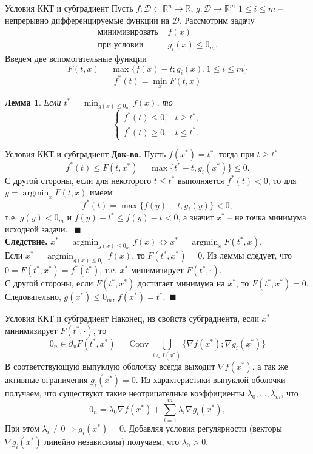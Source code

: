 \documentclass[10pt, handout]{beamer}
\DeclareMathOperator{\argmin}{argmin}
\DeclareMathOperator{\conv}{Conv}
\newtheorem{lemma_ru}{Лемма}[]
\begin{document}
\begin{frame}{Условия ККТ и субградиент}
Пусть $f:\mathcal{D}\subset \mathbb{R}^n\rightarrow \mathbb{R}$, $g:\mathcal{D}\rightarrow \mathbb{R}^m$ $1\leq i \leq m$ -- непрерывно дифференцируемые функции на $\mathcal{D}$. Рассмотрим задачу
$$
\begin{array}{ll}
\mbox{минимизировать } & f(x)\\
\mbox{при условии } & g_i(x)\leq 0_m.
\end{array}
$$
\pause
Введем две вспомогательные функции
$$
F(t, x)=\max\{f(x)-t; g_i(x), 1\leq i\leq m\}
$$
$$f^*(t)=\min_{x}F(t,x)$$
\pause
\begin{lemma_ru}
Если $t^*=\min_{g(x)\leq 0_m}f(x)$, то
$$
\begin{cases}
f^*(t)\leq 0, & t\geq t^*,\\
f^*(t)\geq 0, & t\leq t^*.
\end{cases}
$$
\end{lemma_ru}
\end{frame}

\begin{frame}{Условия ККТ и субградиент}
\textbf{Док-во.} Пусть $f(x^*)=t^*$, тогда при $t\geq t^*$
$$
f^*(t)\leq F(t, x^*)=\max\{t^*-t, g_i(x^*)\}\leq 0.
$$
С другой стороны, если для некоторого $t\leq t^*$ выполняется $f^*(t)< 0$, то для $y=\argmin_x F(t, x)$ имеем
$$
f^*(t)=\max\{f(y)-t, g_i(y)\}< 0,
$$
т.е. $g(y)< 0_m$ и $f(y)-t^*\leq f(y)-t< 0$, а значит $x^*$ -- не точка минимума исходной задачи. $~~\blacksquare$\\
\pause
\textbf{Следствие.} $x^*=\argmin_{g(x)\leq 0_m}f(x)\Leftrightarrow x^*=\argmin_x F(t^*, x)$.\\
\pause
\vspace{1em}
Если $x^*=\argmin_{g(x)\leq 0_m}f(x)$, то $F(t^*, x^*)=0$. Из леммы следует, что $0=F(t^*, x^*)=f^*(t^*)$, т.е. $x^*$ минимизирует $F(t^*, \cdot)$.\\
\pause
\vspace{1em}
С другой стороны, если $F(t^*, x^*)$ достигает минимума на $x^*$, то $F(t^*, x^*)=0$. Следовательно, $g(x^*)\leq 0_m$, $f(x^*)= t^*$.~$\blacksquare$
\end{frame}


\begin{frame}{Условия ККТ и субградиент}
Наконец, из свойств субградиента, если $x^*$ минимизирует $F(t^*, \cdot)$, то 
$$
0_n\in\partial_x F(t^*, x^*)=\conv\bigcup_{i\in I(x^*)}\{\nabla f(x^*); \nabla g_i(x^*)\}
$$
В соответствующую выпуклую оболочку всегда выходит $\nabla f(x^*)$, а так же активные ограничения $g_i(x^*)=0$. Из характеристики выпуклой оболочки получаем, что существуют такие неотрицателные коэффициенты $\lambda_0, \ldots, \lambda_m$, что
$$
0_n=\lambda_0\nabla f(x^*)+\sum_{i=1}^m\lambda_i\nabla g_i(x^*),
$$ 
При этом $\lambda_i\neq 0\Rightarrow g_i(x^*)=0$. Добавляя условия регулярности (векторы $\nabla g_i(x^*)$ линейно независимы) получаем, что $\lambda_0>0$.
\end{frame}
\end{document}

